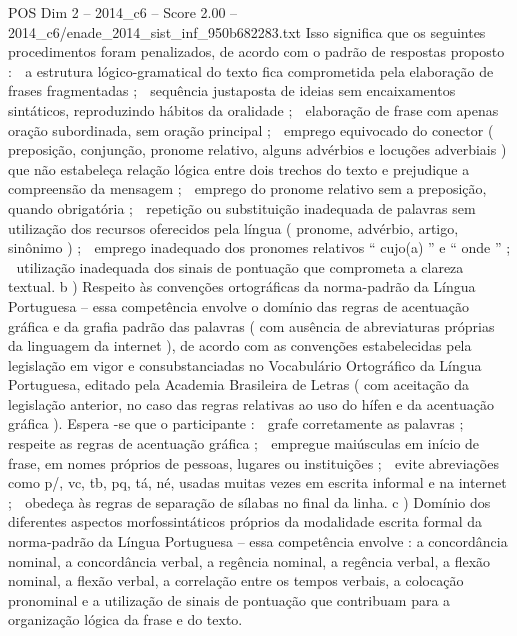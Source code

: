 \begin{textsample}{POS Dim 2 – 2014\_c6 – Score 2.00 – 2014\_c6/enade\_2014\_sist\_inf\_950b682283.txt}
Isso significa que os seguintes procedimentos foram penalizados, de acordo com o padrão de respostas proposto :  a estrutura lógico-gramatical do texto fica comprometida pela elaboração de frases fragmentadas ;  sequência justaposta de ideias sem encaixamentos sintáticos, reproduzindo hábitos da oralidade ;  elaboração de frase com apenas oração subordinada, sem oração principal ;  emprego equivocado do conector ( preposição, conjunção, pronome relativo, alguns advérbios e locuções adverbiais ) que não estabeleça relação lógica entre dois trechos do texto e prejudique a compreensão da mensagem ;  emprego do pronome relativo sem a preposição, quando obrigatória ;  repetição ou substituição inadequada de palavras sem utilização dos recursos oferecidos pela língua ( pronome, advérbio, artigo, sinônimo ) ;  emprego inadequado dos pronomes relativos “ cujo(a) ” e “ onde ” ;  utilização inadequada dos sinais de pontuação que comprometa a clareza textual. b ) Respeito às convenções ortográficas da norma-padrão da Língua Portuguesa – essa competência envolve o domínio das regras de acentuação gráfica e da grafia padrão das palavras ( com ausência de abreviaturas próprias da linguagem da internet ), de acordo com as convenções estabelecidas pela legislação em vigor e consubstanciadas no Vocabulário Ortográfico da Língua Portuguesa, editado pela Academia Brasileira de Letras ( com aceitação da legislação anterior, no caso das regras relativas ao uso do hífen e da acentuação gráfica ).
Espera -se que o participante :  grafe corretamente as palavras ;  respeite as regras de acentuação gráfica ;  empregue maiúsculas em início de frase, em nomes próprios de pessoas, lugares ou instituições ;  evite abreviações como p/, vc, tb, pq, tá, né, usadas muitas vezes em escrita informal e na internet ;  obedeça às regras de separação de sílabas no final da linha. c ) Domínio dos diferentes aspectos morfossintáticos próprios da modalidade escrita formal da norma-padrão da Língua Portuguesa – essa competência envolve : a concordância nominal, a concordância verbal, a regência nominal, a regência verbal, a flexão nominal, a flexão verbal, a correlação entre os tempos verbais, a colocação pronominal e a utilização de sinais de pontuação que contribuam para a organização lógica da frase e do texto.

\end{textsample}
